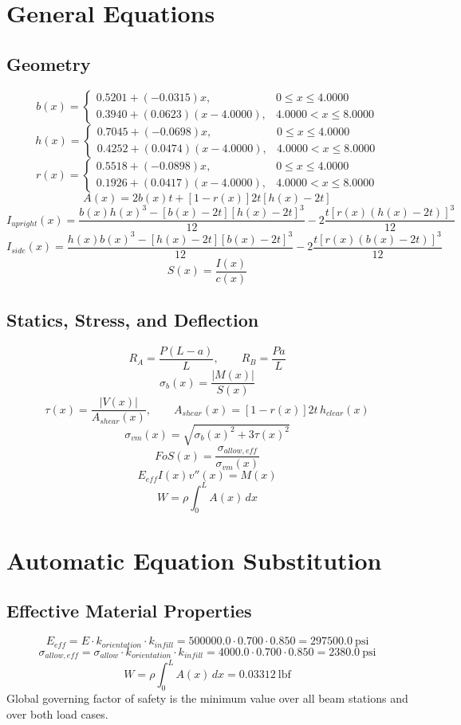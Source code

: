 \documentclass[11pt]{article}
\begin{document}
\section*{General Equations}
\subsection*{Geometry}
\[
b(x)=\begin{cases}0.5201 + (-0.0315)x, & 0 \le x \le 4.0000\\0.3940 + (0.0623)(x-4.0000), & 4.0000 < x \le 8.0000\end{cases}
\]
\[
h(x)=\begin{cases}0.7045 + (-0.0698)x, & 0 \le x \le 4.0000\\0.4252 + (0.0474)(x-4.0000), & 4.0000 < x \le 8.0000\end{cases}
\]
\[
r(x)=\begin{cases}0.5518 + (-0.0898)x, & 0 \le x \le 4.0000\\0.1926 + (0.0417)(x-4.0000), & 4.0000 < x \le 8.0000\end{cases}
\]
\[
A(x)=2b(x)t+[1-r(x)]2t[h(x)-2t]
\]
\[
I_{upright}(x)=\frac{b(x)h(x)^3-[b(x)-2t][h(x)-2t]^3}{12}-2\frac{t[r(x)(h(x)-2t)]^3}{12}
\]
\[
I_{side}(x)=\frac{h(x)b(x)^3-[h(x)-2t][b(x)-2t]^3}{12}-2\frac{t[r(x)(b(x)-2t)]^3}{12}
\]
\[
S(x)=\frac{I(x)}{c(x)}
\]

\subsection*{Statics, Stress, and Deflection}
\[
R_A=\frac{P(L-a)}{L}, \qquad R_B=\frac{Pa}{L}
\]
\[
\sigma_b(x)=\frac{|M(x)|}{S(x)}
\]
\[
\tau(x)=\frac{|V(x)|}{A_{shear}(x)}, \qquad A_{shear}(x)=[1-r(x)]2t\,h_{clear}(x)
\]
\[
\sigma_{vm}(x)=\sqrt{\sigma_b(x)^2+3\tau(x)^2}
\]
\[
FoS(x)=\frac{\sigma_{allow,eff}}{\sigma_{vm}(x)}
\]
\[
E_{eff}I(x)v''(x)=M(x)
\]
\[
W=\rho\int_0^L A(x)\,dx
\]

\section*{Automatic Equation Substitution}
\subsection*{Effective Material Properties}
\[E_{eff} = E \cdot k_{orientation} \cdot k_{infill} = 500000.0 \cdot 0.700 \cdot 0.850 = 297500.0\ \mathrm{psi}\]
\[\sigma_{allow,eff} = \sigma_{allow} \cdot k_{orientation} \cdot k_{infill} = 4000.0 \cdot 0.700 \cdot 0.850 = 2380.0\ \mathrm{psi}\]
\[W = \rho \int_0^L A(x)\,dx = 0.03312\ \mathrm{lbf}\]
Global governing factor of safety is the minimum value over all beam stations and over both load cases.
\end{document}
